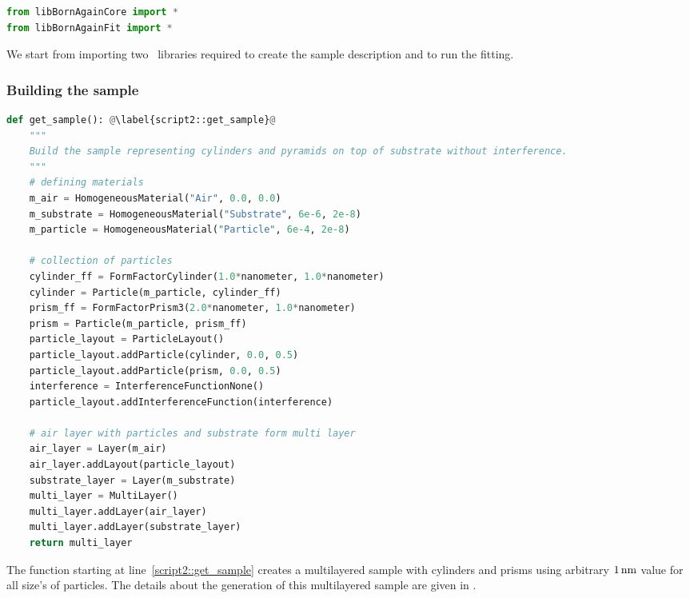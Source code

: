\begin{lstlisting}[language=python, style=eclipseboxed]
from libBornAgainCore import *
from libBornAgainFit import *
\end{lstlisting}
We start from importing two \BornAgain\ libraries required to create
the sample description
and to run the fitting.

\subsubsection*{Building the sample}

\begin{lstlisting}[language=python, style=eclipseboxed, firstnumber=5]
def get_sample(): @\label{script2::get_sample}@
    """
    Build the sample representing cylinders and pyramids on top of substrate without interference.
    """
    # defining materials
    m_air = HomogeneousMaterial("Air", 0.0, 0.0)
    m_substrate = HomogeneousMaterial("Substrate", 6e-6, 2e-8)
    m_particle = HomogeneousMaterial("Particle", 6e-4, 2e-8)

    # collection of particles
    cylinder_ff = FormFactorCylinder(1.0*nanometer, 1.0*nanometer)
    cylinder = Particle(m_particle, cylinder_ff)
    prism_ff = FormFactorPrism3(2.0*nanometer, 1.0*nanometer)
    prism = Particle(m_particle, prism_ff)
    particle_layout = ParticleLayout()
    particle_layout.addParticle(cylinder, 0.0, 0.5)
    particle_layout.addParticle(prism, 0.0, 0.5)
    interference = InterferenceFunctionNone()
    particle_layout.addInterferenceFunction(interference)

    # air layer with particles and substrate form multi layer
    air_layer = Layer(m_air)
    air_layer.addLayout(particle_layout)
    substrate_layer = Layer(m_substrate)
    multi_layer = MultiLayer()
    multi_layer.addLayer(air_layer)
    multi_layer.addLayer(substrate_layer)
    return multi_layer
\end{lstlisting}
The function starting at line~\ref{script2::get_sample} creates a multilayered sample
with cylinders and prisms using arbitrary $1\,{\rm nm}$ value for all size's of particles.
The details about the generation of this multilayered sample are given in .

